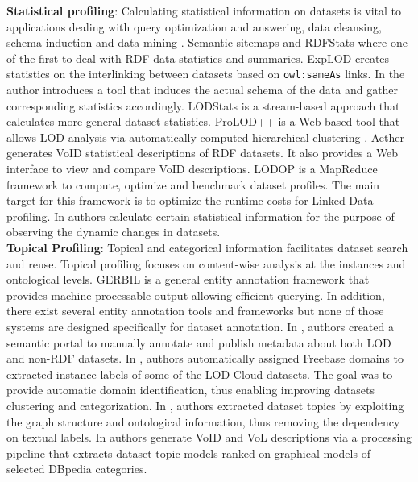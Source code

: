 \documentclass[runningheads,a4paper]{llncs}
\begin{document}
\textbf{Statistical profiling}: Calculating statistical information on datasets is vital to applications dealing with query optimization and answering, data cleansing, schema induction and data mining \cite{profilingWebOfData} \cite{datafinland2} \cite{6690016}. Semantic sitemaps \cite{Cyganiak:2008:SSE:1789394.1789457} and RDFStats \cite{Langegger:2009:RER:1674635.1674691} where one of the first to deal with RDF data statistics and summaries. ExpLOD \cite{Khatchadourian:2010:ESE:2155278.2155300} creates statistics on the interlinking between datasets based on \texttt{owl:sameAs} links. In \cite{semwebprofiling} the author introduces a tool that induces the actual schema of the data and gather corresponding statistics accordingly. LODStats  \cite{Auer:2012:LEF:2413941.2413982} is a stream-based approach that calculates more general dataset statistics. ProLOD++ \cite{6816740} is a Web-based tool that allows LOD analysis via automatically computed hierarchical clustering \cite{5452762}. Aether \cite{makela-aether-2014} generates VoID statistical descriptions of RDF datasets. It also provides a Web interface to view and compare VoID descriptions. LODOP \cite{forchhammer_profiles_2014} is a MapReduce framework to compute, optimize and benchmark dataset profiles. The main target for this framework is to optimize the runtime costs for Linked Data profiling. In \cite{DyLDO} authors calculate certain statistical information for the purpose of observing the dynamic changes in datasets.\\

\textbf{Topical Profiling}: Topical and categorical information facilitates dataset search and reuse. Topical profiling focuses on content-wise analysis at the instances and ontological levels. GERBIL \cite{gerbil} is a general entity annotation framework that provides machine processable output allowing efficient querying. In addition, there exist several entity annotation tools and frameworks \cite{Cornolti:2013:FBE:2488388.2488411} but none of those systems are designed specifically for dataset annotation. In \cite{datafinalnd}, authors created a semantic portal to manually annotate and publish metadata about both LOD and non-RDF datasets. In \cite{6690016}, authors automatically assigned Freebase domains to extracted instance labels of some of the LOD Cloud datasets. The goal was to provide automatic domain identification, thus enabling improving datasets clustering and categorization. In \cite{Bohm:2012:LTG:2396761.2398718}, authors extracted dataset topics by exploiting the graph structure and ontological information, thus removing the dependency on textual labels. In  \cite{scalableApproach} authors generate VoID and VoL descriptions via a processing pipeline that extracts dataset topic models ranked on graphical models of selected DBpedia categories.\\
\end{document}

